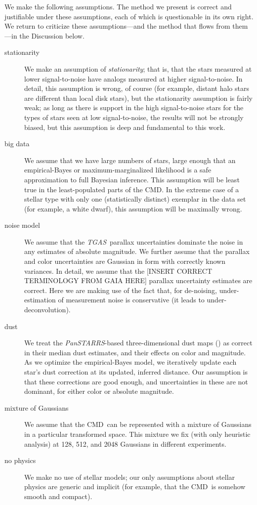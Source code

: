 \documentclass[modern]{aastex61}
\newcommand{\acronym}[1]{{\small{#1}}}
\newcommand{\project}[1]{\textsl{#1}}
\newcommand{\tgas}{\project{\acronym{TGAS}}}
\newcommand{\panstarrs}{\project{Pan\acronym{STARRS}}}
\newcommand{\cmd}{\acronym{CMD}}
\begin{document}
We make the following assumptions. The method we present is correct
and justifiable under these assumptions, each of which is questionable
in its own right. We return to criticize these assumptions---and the
method that flows from them---in the Discussion below.
\begin{description}
\item[stationarity] We make an assumption of \emph{stationarity}; that is, that the
  stars measured at lower signal-to-noise have analogs measured at
  higher signal-to-noise.  In detail, this assumption is wrong, of
  course (for example, distant halo stars are different than local
  disk stars), but the stationarity assumption is fairly weak; as long
  as there is support in the high signal-to-noise stars for the types
  of stars seen at low signal-to-noise, the results will not be
  strongly biased, but this assumption is deep and fundamental to this
  work.
\item[big data] We assume that we have large numbers of stars, large enough that
  an empirical-Bayes or maximum-marginalized likelihood is a safe
  approximation to full Bayesian inference. This assumption will be
  least true in the least-populated parts of the \cmd. In the extreme
  case of a stellar type with only one (statistically distinct)
  exemplar in the data set (for example, a white dwarf), this assumption will be maximally wrong.
\item[noise model] We assume that the \tgas\ parallax uncertainties dominate the
  noise in any estimates of absolute magnitude. We further assume that
  the parallax and color uncertainties are Gaussian in form with
  correctly known variances. In detail, we assume that the [INSERT
    CORRECT TERMINOLOGY FROM GAIA HERE] parallax uncertainty estimates
  are correct. Here we are making use of the fact that, for
  de-noising, under-estimation of measurement noise is conservative
  (it leads to under-deconvolution).
\item[dust] We treat the \panstarrs-based three-dimensional dust maps (\citealt{green15})
  as correct in their median dust estimates, and their
  effects on color and magnitude. As we optimize the empirical-Bayes model, we iteratively update each star's
  dust correction at its updated, inferred distance. Our assumption is that these corrections are
  good enough, and uncertainties in these are not dominant, for either
  color or absolute magnitude.
\item[mixture of Gaussians] We assume that the \cmd\ can be represented with a mixture of
  Gaussians in a particular transformed space. This mixture we fix
  (with only heuristic analysis) at 128, 512, and 2048 Gaussians in
  different experiments.
\item[no physics] We make no use of stellar models; our only assumptions about
  stellar physics are generic and implicit (for example, that the
  \cmd\ is somehow smooth and compact).
\end{description}
\end{document}
